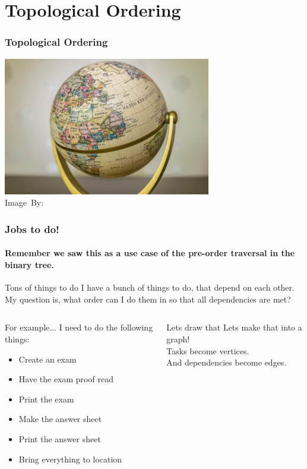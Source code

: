 \section{Topological Ordering}%
\label{sec:topological_ordering}

\begin{frame}
	\frametitle{Topological Ordering}
	
	\begin{center}
		\includegraphics[width=0.68\textwidth]{figures/topology.jpeg}\\
		\hspace*{15pt}\hbox{\scriptsize Image By:}
	\end{center}
\end{frame}

\begin{frame}
	\frametitle{Jobs to do!}
	\framesubtitle{Remember we saw this as a use case of the pre-order traversal in the binary tree.}
	\begin{problemblock}{Tons of things to do}
		I have a bunch of things to do, that depend on each other. My question is, what order can I do them in so that all
		dependencies are met?
	\end{problemblock}
	\pause
	\begin{columns}
		\begin{exampleblock}{For example...}
			I need to do the following things:
			\begin{itemize}
				\item Create an exam
		\pause
				\item Have the exam proof read
				\item Print the exam
		\pause
				\item Make the answer sheet
				\item Print the answer sheet
		\pause
				\item Bring everything to location
			\end{itemize}
		\end{exampleblock}	
		\pause
			\begin{block}{Lets draw that}
				Lets make that into a graph!\\
				Tasks become vertices.\\
				And dependencies become edges.\\
			\end{block}	
	\end{columns}
\end{frame}

